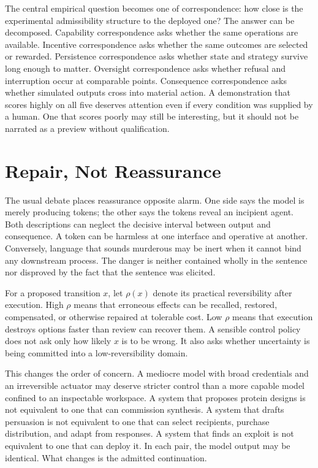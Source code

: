 \documentclass[11pt]{article}
\theoremstyle{definition}
\begin{document}
The central empirical question becomes one of correspondence: how close is the experimental admissibility structure to the deployed one? The answer can be decomposed. Capability correspondence asks whether the same operations are available. Incentive correspondence asks whether the same outcomes are selected or rewarded. Persistence correspondence asks whether state and strategy survive long enough to matter. Oversight correspondence asks whether refusal and interruption occur at comparable points. Consequence correspondence asks whether simulated outputs cross into material action. A demonstration that scores highly on all five deserves attention even if every condition was supplied by a human. One that scores poorly may still be interesting, but it should not be narrated as a preview without qualification.

\section{Repair, Not Reassurance}

The usual debate places reassurance opposite alarm. One side says the model is merely producing tokens; the other says the tokens reveal an incipient agent. Both descriptions can neglect the decisive interval between output and consequence. A token can be harmless at one interface and operative at another. Conversely, language that sounds murderous may be inert when it cannot bind any downstream process. The danger is neither contained wholly in the sentence nor disproved by the fact that the sentence was elicited.

For a proposed transition $x$, let $\rho(x)$ denote its practical reversibility after execution. High $\rho$ means that erroneous effects can be recalled, restored, compensated, or otherwise repaired at tolerable cost. Low $\rho$ means that execution destroys options faster than review can recover them. A sensible control policy does not ask only how likely $x$ is to be wrong. It also asks whether uncertainty is being committed into a low-reversibility domain.

This changes the order of concern. A mediocre model with broad credentials and an irreversible actuator may deserve stricter control than a more capable model confined to an inspectable workspace. A system that proposes protein designs is not equivalent to one that can commission synthesis. A system that drafts persuasion is not equivalent to one that can select recipients, purchase distribution, and adapt from responses. A system that finds an exploit is not equivalent to one that can deploy it. In each pair, the model output may be identical. What changes is the admitted continuation.
\end{document}
